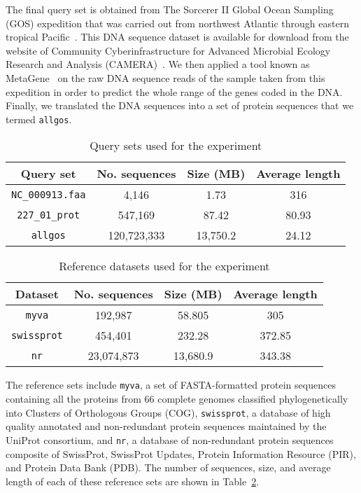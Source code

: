 \documentclass[titlepage]{csetr}
\begin{document}
The final query set is obtained from The Sorcerer II Global Ocean Sampling (GOS) expedition that was carried out from northwest Atlantic through eastern tropical Pacific~\cite{GOS}. This DNA sequence dataset is available for download from the website of Community Cyberinfrastructure for Advanced Microbial Ecology Research and Analysis (CAMERA)~\cite{CAMERA}. We then applied a tool known as MetaGene~\cite{Metagene} on the raw DNA sequence reads of the sample taken from this expedition in order to predict the whole range of the genes coded in the DNA. Finally, we translated the DNA sequences into a set of protein sequences that we termed \texttt{allgos}.



\begin{table}[t]
\centering
\caption{Query sets used for the experiment}
\label{tbl:Querysets}
\begin{tabular} { | c | c | c | c |}
\hline
Query set & No. sequences & Size (MB) & Average length\\
\hline
\texttt{NC\_000913.faa} & 4,146 & 1.73 & 316\\
\texttt{227\_01\_prot} & 547,169 & 87.42 &  80.93\\
\texttt{allgos} & 120,723,333 & 13,750.2 & 24.12\\
\hline
\end{tabular}
\end{table}

\begin{table}[t]
\centering
\caption{Reference datasets used for the experiment}
\label{tbl:Datasets}
\begin{tabular} {| c | c | c | c | }
\hline
Dataset & No. sequences & Size (MB) & Average length\\
\hline
\texttt{myva} & 192,987 & 58.805 & 305\\
\texttt{swissprot} & 454,401 & 232.28 & 372.85\\
\texttt{nr} & 23,074,873 & 13,680.9 & 343.38\\
\hline
\end{tabular}
\end{table}


The reference sets include \texttt{myva}, a set of FASTA-formatted protein sequences containing all the proteins from 66 complete genomes classified phylogenetically into Clusters of Orthologous Groups (COG), \texttt{swissprot}, a database of high quality annotated and non-redundant protein sequences maintained by the UniProt consortium, and \texttt{nr}, a database of non-redundant protein sequences composite of SwissProt, SwissProt Updates, Protein Information Resource (PIR), and Protein Data Bank (PDB). The number of sequences, size, and  average length of each of these reference sets are shown in Table~\ref{tbl:Datasets}.
\end{document}
